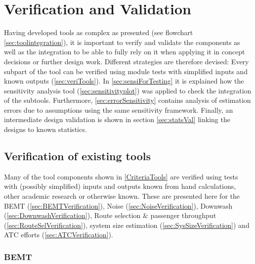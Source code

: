 \newpage
\chapter{Verification and Validation}
\label{ch-VandV}

Having developed tools as complex as presented (see flowchart \autoref{sec:toolintegration}), it is important to verify and validate the components as well as the integration to be able to fully rely on it when applying it in concept decisions or further design work. Different strategies are therefore devised: Every subpart of the tool can be verified using module tests with simplified inputs and known outputs (\autoref{sec:veriTools}). In \autoref{sec:sensiForTesting} it is explained how the sensitivity analysis tool (\autoref{sec:sensitivityplot}) was applied to check the integration of the subtools. Furthermore, \autoref{sec:errorSensitivity} contains analysis of estimation errors due to assumptions using the same sensitivity framework. Finally, an intermediate design validation is shown in section \ref{sec:statsVal} linking the designs to known statistics.


\section{Verification of existing tools} \label{sec:veriTools}

Many of the tool components shown in \autoref{CriteriaTools} are verified using tests with (possibly simplified) inputs and outputs known from hand calculations, other academic research or otherwise known. These are presented here for the BEMT (\autoref{sec:BEMTVerification}), Noise (\autoref{sec:NoiseVerification}), Downwash (\autoref{sec:DownwashVerification}), Route selection \& passenger throughput (\autoref{sec:RouteSelVerification}), system size estimation (\autoref{sec:SysSizeVerification}) and ATC efforts (\autoref{sec:ATCVerification}).



\subsection{BEMT}  \label{sec:BEMTVerification}

